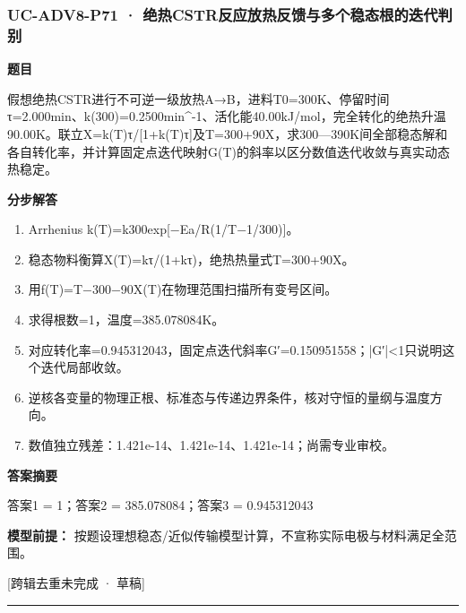 \documentclass[UTF8,11pt,a4paper]{ctexart}
\begin{document}
\subsubsection*{UC-ADV8-P71 · 绝热CSTR反应放热反馈与多个稳态根的迭代判别}
\noindent\textbf{题目}\par
假想绝热CSTR进行不可逆一级放热A→B，进料T0=300K、停留时间τ=2.000min、k(300)=0.2500min\textasciicircum{}-1、活化能40.00kJ/mol，完全转化的绝热升温90.00K。联立X=k(T)τ/[1+k(T)τ]及T=300+90X，求300—390K间全部稳态解和各自转化率，并计算固定点迭代映射G(T)的斜率以区分数值迭代收敛与真实动态热稳定。\par
\medskip\noindent\textbf{分步解答}
\begin{enumerate}
\item Arrhenius k(T)=k300exp[−Ea/R(1/T−1/300)]。
\item 稳态物料衡算X(T)=kτ/(1+kτ)，绝热热量式T=300+90X。
\item 用f(T)=T−300−90X(T)在物理范围扫描所有变号区间。
\item 求得根数=1，温度=385.078084K。
\item 对应转化率=0.945312043，固定点迭代斜率G′=0.150951558；|G′|<1只说明这个迭代局部收敛。
\item 逆核各变量的物理正根、标准态与传递边界条件，核对守恒的量纲与温度方向。
\item 数值独立残差：1.421e-14、1.421e-14、1.421e-14；尚需专业审校。
\end{enumerate}
\noindent\textbf{答案摘要}\par
答案1 = 1；答案2 = 385.078084；答案3 = 0.945312043\par
\noindent\textbf{模型前提：}
按题设理想稳态/近似传输模型计算，不宣称实际电极与材料满足全范围。\par
\noindent\textcolor{red!65!black}{[跨辑去重未完成 · 草稿]} \par
\medskip\hrule\medskip
{}
\end{document}
